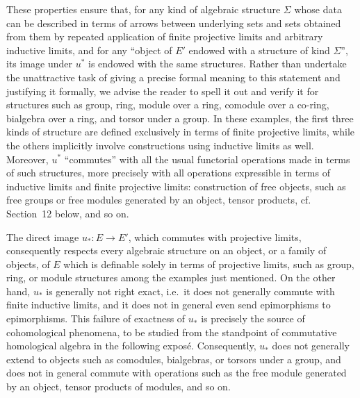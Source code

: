 \documentclass[11pt]{article}
\newcommand{\ie}{i.e.}
\begin{document}
These properties ensure that, for any kind of algebraic structure \(\Sigma\) whose data can be described in terms of arrows between underlying sets and sets obtained from them by repeated application of finite projective limits and arbitrary inductive limits, and for any ``object of \(E'\) endowed with a structure of kind \(\Sigma\)'', its image under \(u^\ast\) is endowed with the same structures. Rather than undertake the unattractive task of giving a precise formal meaning to this statement and justifying it formally, we advise the reader to spell it out and verify it for structures such as group, ring, module over a ring, comodule over a co-ring, bialgebra over a ring, and torsor under a group. In these examples, the first three kinds of structure are defined exclusively in terms of finite projective limits, while the others implicitly involve constructions using inductive limits as well. Moreover, \(u^\ast\) ``commutes'' with all the usual functorial operations made in terms of such structures, more precisely with all operations expressible in terms of inductive limits and finite projective limits: construction of free objects, such as free groups or free modules generated by an object, tensor products, cf. Section~12 below, and so on.

The direct image \(u_\ast:E\to E'\), which commutes with projective limits, consequently respects every algebraic structure on an object, or a family of objects, of \(E\) which is definable solely in terms of projective limits, such as group, ring, or module structures among the examples just mentioned. On the other hand, \(u_\ast\) is generally not right exact, \ie\ it does not generally commute with finite inductive limits, and it does not in general even send epimorphisms to epimorphisms. This failure of exactness of \(u_\ast\) is precisely the source of cohomological phenomena, to be studied from the standpoint of commutative homological algebra in the following expos\'e. Consequently, \(u_\ast\) does not generally extend to objects such as comodules, bialgebras, or torsors under a group, and does not in general commute with operations such as the free module generated by an object, tensor products of modules, and so on.
\end{document}
